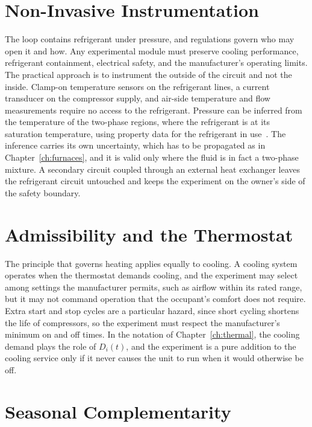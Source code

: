 \section{Non-Invasive Instrumentation}

The loop contains refrigerant under pressure, and regulations govern who may open it and how. Any experimental module must preserve cooling performance, refrigerant containment, electrical safety, and the manufacturer's operating limits. The practical approach is to instrument the outside of the circuit and not the inside. Clamp-on temperature sensors on the refrigerant lines, a current transducer on the compressor supply, and air-side temperature and flow measurements require no access to the refrigerant. Pressure can be inferred from the temperature of the two-phase regions, where the refrigerant is at its saturation temperature, using property data for the refrigerant in use~\cite{bell2014}. The inference carries its own uncertainty, which has to be propagated as in Chapter~\ref{ch:furnaces}, and it is valid only where the fluid is in fact a two-phase mixture. A secondary circuit coupled through an external heat exchanger leaves the refrigerant circuit untouched and keeps the experiment on the owner's side of the safety boundary.

\section{Admissibility and the Thermostat}

The principle that governs heating applies equally to cooling. A cooling system operates when the thermostat demands cooling, and the experiment may select among settings the manufacturer permits, such as airflow within its rated range, but it may not command operation that the occupant's comfort does not require. Extra start and stop cycles are a particular hazard, since short cycling shortens the life of compressors, so the experiment must respect the manufacturer's minimum on and off times. In the notation of Chapter~\ref{ch:thermal}, the cooling demand plays the role of $D_i(t)$, and the experiment is a pure addition to the cooling service only if it never causes the unit to run when it would otherwise be off.

\section{Seasonal Complementarity}

